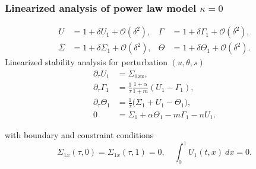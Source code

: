 \documentclass{beamer}
\begin{document}
\begin{frame}\frametitle{Linearized analysis of power law model $\kappa = 0$}
{\small

\begin{align*}
 U &= 1 + \delta U_1 + \mathcal{O}(\delta^2), & \Gamma &= 1 + \delta \Gamma_1 + \mathcal{O}(\delta^2), \\
 \Sigma &= 1 + \delta \Sigma_1 + \mathcal{O}(\delta^2), & \Theta &= 1 + \delta \Theta_1 + \mathcal{O}(\delta^2).
\end{align*}
{\color{blue}Linearized stability analysis} for perturbation $(u, \theta, s)$
\begin{equation} \label{eq:linsystem}
 \begin{aligned}
  \partial_\tau U_1 &= \Sigma_{1xx},\\
  \partial_\tau\Gamma_1 &= \frac{1}{\tau}\frac{1+\alpha}{1+m}(U_1-\Gamma_1),\\
  \partial_\tau\Theta_1 &= \frac{1}{\tau}\Big(\Sigma_1+ U_1 -\Theta_1\Big),\\
  0&=\Sigma_1 + \alpha\Theta_1 -m\Gamma_1 - nU_1 .
 \end{aligned}
\end{equation}


with boundary and constraint conditions
\begin{equation} \label{eq:linbdry}
 \Sigma_{1x}(\tau,0)=\Sigma_{1x}(\tau,1)=0, \quad \int_0^1 U_1(t,x) \: dx = 0.
\end{equation}

}

\end{frame}
\end{document}
